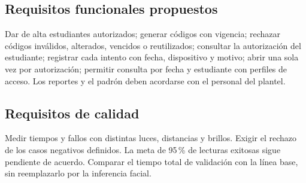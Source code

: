 \documentclass[11pt,letterpaper]{article}
\begin{document}
\subsection{Requisitos funcionales propuestos}
Dar de alta estudiantes autorizados; generar códigos con vigencia; rechazar códigos inválidos, alterados, vencidos o reutilizados; consultar la autorización del estudiante; registrar cada intento con fecha, dispositivo y motivo; abrir una sola vez por autorización; permitir consulta por fecha y estudiante con perfiles de acceso. Los reportes y el padrón deben acordarse con el personal del plantel.

\subsection{Requisitos de calidad}
Medir tiempos y fallos con distintas luces, distancias y brillos. Exigir el rechazo de los casos negativos definidos. La meta de 95\,\% de lecturas exitosas sigue pendiente de acuerdo. Comparar el tiempo total de validación con la línea base, sin reemplazarlo por la inferencia facial.
\end{document}
